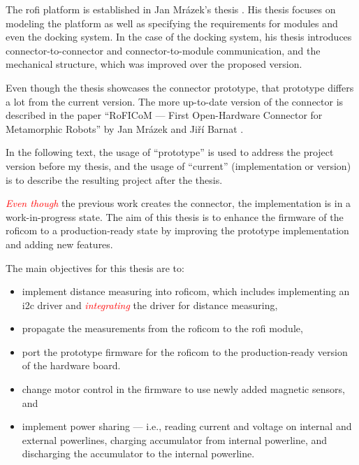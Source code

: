 \documentclass[
  digital,     %
  oneside,     %
  nosansbold,  %
  nocolorbold, %
  nolof,         %
  nolot,         %
]{fithesis4}
\newcommand{\TODO}[1]{\textcolor{red}{\textit{#1}}}
\begin{document}
The \acrshort{rofi} platform is established in Jan Mrázek's thesis \cite{Mrazek2019thesis}. His thesis focuses on modeling the platform as well as specifying the requirements for modules and even the docking system. In the case of the docking system, his thesis introduces connector-to-connector and connector-to-module communication, and the mechanical structure, which was improved over the proposed version.

Even though the thesis showcases the connector prototype, that prototype differs a lot from the current version. The more up-to-date version of the connector is described in the paper ``RoFICoM --- First Open-Hardware Connector for Metamorphic Robots'' by Jan Mrázek and Jiří Barnat \cite{MrazekBarnat2019Roficom}.

In the following text, the usage of ``prototype'' is used to address the project version before my thesis, and the usage of ``current'' (implementation or version) is to describe the resulting project after the thesis.

\TODO{Even though} the previous work creates the connector, the implementation is in a work-in-progress state. The aim of this thesis is to enhance the firmware of the \acrshort{roficom} to a production-ready state by improving the prototype implementation and adding new features.

The main objectives for this thesis are to:
\begin{itemize}
    \item implement distance measuring into \acrshort{roficom}, which includes implementing an \acrshort{i2c} driver and \TODO{integrating} the driver for distance measuring,
    \item propagate the measurements from the \acrshort{roficom} to the \acrshort{rofi} module, 
    \item port the prototype firmware for the \acrshort{roficom} to the production-ready version of the hardware board.
    \item change motor control in the firmware to use newly added magnetic sensors, and
    \item implement power sharing --- i.e., reading current and voltage on internal and external powerlines, charging accumulator from internal powerline, and discharging the accumulator to the internal powerline.
\end{itemize}
\end{document}
